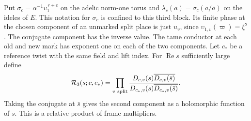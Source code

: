 \documentclass[a4paper,11pt]{article}
\theoremstyle{definition}
\theoremstyle{remark}
\numberwithin{equation}{section}
\begin{document}
Put \(\sigma_c=\alpha^{-1}\upsilon_1^{\,r+e}\) on the adelic
norm-one torus and \(\lambda_c(a)=\sigma_c(a/\bar a)\) on the
ideles of \(E\). This notation for \(\sigma_c\) is confined
to this third block. Its finite phase at the chosen component
of an unmarked split place is just \(u_v\), since
\(\upsilon_{1,v}(\varpi)=\xi^2\). The conjugate component
has the inverse value. The tame conductor at each old and
new mark has exponent one on each of the two components.
Let \(c_*\) be a reference twist with the same field and
lift index. For \(\operatorname{Re}s\) sufficiently large define
\[
 \mathcal R_3(s;c,c_*)=
 \prod_{v\ {\rm split}}
 \frac{D_{c,v}(s)\overline{D_{c,v}(\bar s)}}
      {D_{c_*,v}(s)\overline{D_{c_*,v}(\bar s)}} .
\]
Taking the conjugate at \(\bar s\) gives the second component
as a holomorphic function of \(s\). This is a relative
product of frame multipliers.
\end{document}
